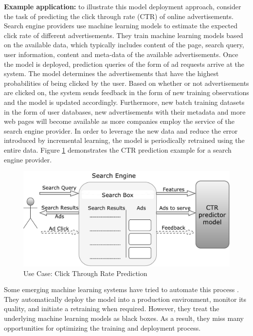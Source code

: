 \documentclass{vldb}
\begin{document}
\textbf{Example application:} to illustrate this model deployment approach, consider the task of predicting the click through rate (CTR) of online advertisements.
Search engine providers use machine learning models to estimate the expected click rate of different advertisements.
They train machine learning models based on the available data, which typically includes content of the page, search query, user information, content and meta-data of the available advertisements. 
Once the model is deployed, prediction queries of the form of ad requests arrive at the system.
The model determines the advertisements that have the highest probabilities of being clicked by the user.
Based on whether or not advertisements are clicked on, the system sends feedback in the form of new training observations and the model is updated accordingly.
Furthermore, new batch training datasets in the form of user databases, new advertisements with their metadata and more web pages will become available as more companies employ the service of the search engine provider.
In order to leverage the new data and reduce the error introduced by incremental learning, the model is periodically retrained using the entire data.
Figure \ref{fig:click-rate} demonstrates the CTR prediction example for a search engine provider.

\begin{figure}[h]
\centering
\includegraphics[width=\columnwidth]{../images/use-case-final.pdf}
\caption{Use Case: Click Through Rate Prediction}
\label{fig:click-rate}
\end{figure}

Some emerging machine learning systems have tried to automate this process \cite{crankshaw2014missing}.
They automatically deploy the model into a production environment, monitor its quality, and initiate a retraining when required.
However, they treat the underlying machine learning models as black boxes. 
As a result, they miss many opportunities for optimizing the training and deployment process.
\end{document}
